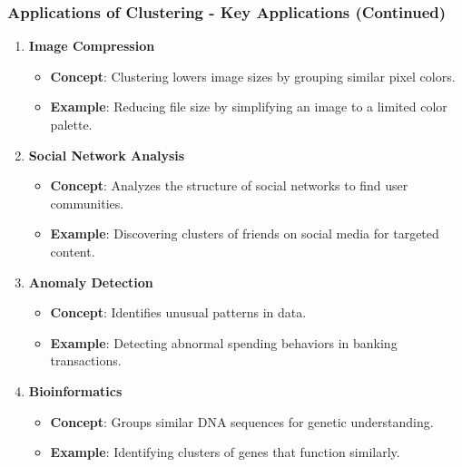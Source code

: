 \documentclass[aspectratio=169]{beamer}
\begin{document}
\begin{frame}[fragile]
    \frametitle{Applications of Clustering - Key Applications (Continued)}
    \begin{enumerate}[resume]
        \item \textbf{Image Compression}
            \begin{itemize}
                \item \textbf{Concept}: Clustering lowers image sizes by grouping similar pixel colors.
                \item \textbf{Example}: Reducing file size by simplifying an image to a limited color palette.
            \end{itemize}
        
        \item \textbf{Social Network Analysis}
            \begin{itemize}
                \item \textbf{Concept}: Analyzes the structure of social networks to find user communities.
                \item \textbf{Example}: Discovering clusters of friends on social media for targeted content.
            \end{itemize}
        
        \item \textbf{Anomaly Detection}
            \begin{itemize}
                \item \textbf{Concept}: Identifies unusual patterns in data.
                \item \textbf{Example}: Detecting abnormal spending behaviors in banking transactions.
            \end{itemize}
        
        \item \textbf{Bioinformatics}
            \begin{itemize}
                \item \textbf{Concept}: Groups similar DNA sequences for genetic understanding.
                \item \textbf{Example}: Identifying clusters of genes that function similarly.
            \end{itemize}
    \end{enumerate}
\end{frame}
\end{document}
